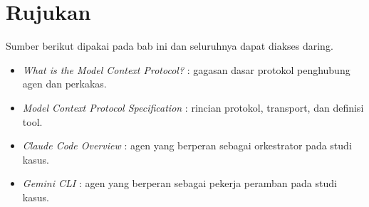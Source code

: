 \section{Rujukan}

Sumber berikut dipakai pada bab ini dan seluruhnya dapat diakses daring.

\begin{itemize}
  \item \textit{What is the Model Context Protocol?} \cite{mcp-intro}: gagasan dasar protokol penghubung agen dan perkakas.
  \item \textit{Model Context Protocol Specification} \cite{mcp-spec}: rincian protokol, transport, dan definisi tool.
  \item \textit{Claude Code Overview} \cite{doc-claude-code}: agen yang berperan sebagai orkestrator pada studi kasus.
  \item \textit{Gemini CLI} \cite{doc-gemini-cli}: agen yang berperan sebagai pekerja peramban pada studi kasus.
\end{itemize}
